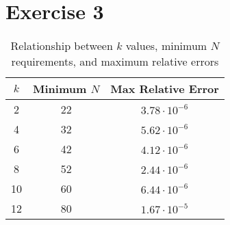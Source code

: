 \section*{Exercise 3}
\begin{table}[H]
    \centering
    \begin{tabular}{|c|c|c|}
        \hline
        $k$ & Minimum $N$ & Max Relative Error \\
        \hline
        2 & 22 & $3.78 \cdot 10^{-6}$ \\
        \hline
        4 & 32 & $5.62 \cdot 10^{-6}$ \\
        \hline
        6 & 42 & $4.12 \cdot 10^{-6}$ \\
        \hline
        8 & 52 & $2.44 \cdot 10^{-6}$ \\
        \hline
        10 & 60 & $6.44 \cdot 10^{-6}$ \\
        \hline
        12 & 80 & $1.67 \cdot 10^{-5}$ \\
        \hline
    \end{tabular}
    \caption{Relationship between $k$ values, minimum $N$ requirements, and maximum relative errors}
    \label{tab:numerical_results}
\end{table}
